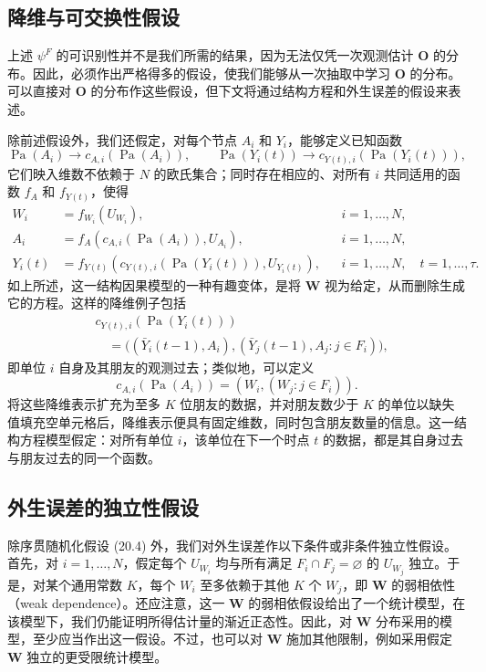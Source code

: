 \subsection{降维与可交换性假设}

上述 $\psi^F$ 的可识别性并不是我们所需的结果，因为无法仅凭一次观测估计 $\mathbf O$ 的分布。因此，必须作出严格得多的假设，使我们能够从一次抽取中学习 $\mathbf O$ 的分布。可以直接对 $\mathbf O$ 的分布作这些假设，但下文将通过结构方程和外生误差的假设来表述。

除前述假设外，我们还假定，对每个节点 $A_i$ 和 $Y_i$，能够定义已知函数
\[
 \operatorname{Pa}(A_i)\longrightarrow c_{A,i}(\operatorname{Pa}(A_i)),
 \qquad
 \operatorname{Pa}(Y_i(t))\longrightarrow c_{Y(t),i}(\operatorname{Pa}(Y_i(t))),
\]
它们映入维数不依赖于 $N$ 的欧氏集合；同时存在相应的、对所有 $i$ 共同适用的函数 $f_A$ 和 $f_{Y(t)}$，使得
\begin{equation}
\begin{aligned}
 W_i&=f_{W_i}(U_{W_i}),&&i=1,\ldots,N,\\
 A_i&=f_A(c_{A,i}(\operatorname{Pa}(A_i)),U_{A_i}),&&i=1,\ldots,N,\\
 Y_i(t)&=f_{Y(t)}(c_{Y(t),i}(\operatorname{Pa}(Y_i(t))),U_{Y_i(t)}),
 &&i=1,\ldots,N,\quad t=1,\ldots,\tau.
\end{aligned}
\tag{20.5}
\end{equation}
如上所述，这一结构因果模型的一种有趣变体，是将 $\mathbf W$ 视为给定，从而删除生成它的方程。这样的降维例子包括
\[
\begin{aligned}
 &c_{Y(t),i}(\operatorname{Pa}(Y_i(t)))\\
 &\quad=\bigl((\bar Y_i(t-1),A_i),(\bar Y_j(t-1),A_j:j\in F_i)\bigr),
\end{aligned}
\]
即单位 $i$ 自身及其朋友的观测过去；类似地，可以定义
\[
 c_{A,i}(\operatorname{Pa}(A_i))=(W_i,(W_j:j\in F_i)).
\]
将这些降维表示扩充为至多 $K$ 位朋友的数据，并对朋友数少于 $K$ 的单位以缺失值填充空单元格后，降维表示便具有固定维数，同时包含朋友数量的信息。这一结构方程模型假定：对所有单位 $i$，该单位在下一个时点 $t$ 的数据，都是其自身过去与朋友过去的同一个函数。

\subsection{外生误差的独立性假设}

除序贯随机化假设 (20.4) 外，我们对外生误差作以下条件或非条件独立性假设。首先，对 $i=1,\ldots,N$，假定每个 $U_{W_i}$ 均与所有满足 $F_i\cap F_j=\varnothing$ 的 $U_{W_j}$ 独立。于是，对某个通用常数 $K$，每个 $W_i$ 至多依赖于其他 $K$ 个 $W_j$，即 $\mathbf W$ 的弱相依性（weak dependence）。还应注意，这一 $\mathbf W$ 的弱相依假设给出了一个统计模型，在该模型下，我们仍能证明所得估计量的渐近正态性。因此，对 $\mathbf W$ 分布采用的模型，至少应当作出这一假设。不过，也可以对 $\mathbf W$ 施加其他限制，例如采用假定 $\mathbf W$ 独立的更受限统计模型。

